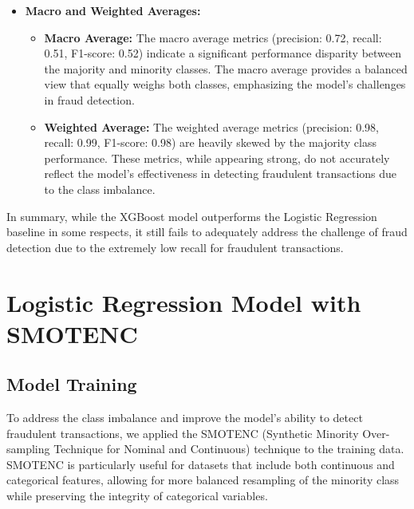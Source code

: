 \documentclass[12pt,a4paper]{report}
\begin{document}
\begin{itemize}
    \item \textbf{Macro and Weighted Averages:}
    \begin{itemize}
        \item \textbf{Macro Average:} The macro average metrics (precision: 0.72, recall: 0.51, F1-score: 0.52) indicate a significant performance disparity between the majority and minority classes. The macro average provides a balanced view that equally weighs both classes, emphasizing the model's challenges in fraud detection.
        \item \textbf{Weighted Average:} The weighted average metrics (precision: 0.98, recall: 0.99, F1-score: 0.98) are heavily skewed by the majority class performance. These metrics, while appearing strong, do not accurately reflect the model's effectiveness in detecting fraudulent transactions due to the class imbalance.
    \end{itemize}
\end{itemize}


In summary, while the XGBoost model outperforms the Logistic Regression baseline in some respects, it still fails to adequately address the challenge of fraud detection due to the extremely low recall for fraudulent transactions.\\








\section{Logistic Regression Model with SMOTENC}

\subsection{Model Training}

To address the class imbalance and improve the model's ability to detect fraudulent transactions, we applied the SMOTENC (Synthetic Minority Over-sampling Technique for Nominal and Continuous) technique to the training data. SMOTENC is particularly useful for datasets that include both continuous and categorical features, allowing for more balanced resampling of the minority class while preserving the integrity of categorical variables.\\

\clearpage
\end{document}

